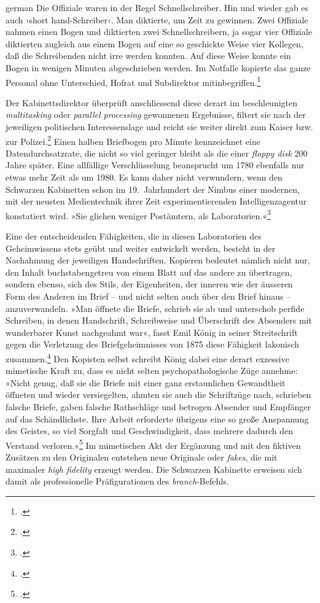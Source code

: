 \documentclass[a4paper,11pt]{article}
\newcommand{\anf}[1]{»#1«}
\newcommand{\inanf}[1]{›#1‹}
\newenvironment{zitat}{
\begin{foreigndisplayquote}{german}}%
{\end{foreigndisplayquote}}
\begin{document}
\begin{zitat}
Die Offiziale waren in der Regel Schnellschreiber. Hin und wieder gab es auch \inanf{short hand-Schreiber}. Man diktierte, um Zeit zu gewinnen. Zwei Offiziale nahmen einen Bogen und diktierten zwei Schnellschreibern, ja sogar vier Offiziale diktierten zugleich aus einem Bogen auf eine so geschickte Weise vier Kollegen, daß die Schreibenden nicht irre werden konnten. Auf diese Weise konnte ein Bogen in wenigen Minuten abgeschrieben werden. Im Notfalle kopierte das ganze Personal ohne Unterschied, Hofrat und Subdirektor mitinbegriffen.\footcite[139]{stix:1937}
\end{zitat}
Der Kabinettsdirektor überprüft anschliessend diese derart im beschleunigten \emph{multitasking} oder \emph{parallel processing} gewonnenen Ergebnisse, filtert sie nach der jeweiligen politischen Interessenslage und reicht sie weiter direkt zum Kaiser bzw. zur Polizei.\footcite[140]{stix:1937} Einen halben Briefbogen pro Minute kennzeichnet eine Datendurchsatzrate, die nicht so viel geringer bleibt als die einer \emph{floppy disk} 200 Jahre später. Eine allfällige Verschlüsselung beansprucht um 1780 ebenfalls nur etwas mehr Zeit als um 1980. Es kann daher nicht verwundern, wenn den Schwarzen Kabinetten schon im 19.~Jahrhundert der Nimbus einer modernen, mit der neusten Medientechnik ihrer Zeit experimentierenden Intelligenzagentur konstatiert wird. \anf{Sie glichen weniger Postämtern, als Laboratorien.}\footcite[40]{koenig:1875}

Eine der entscheidenden Fähigkeiten, die in diesen Laboratorien des Geheimwissens stets geübt und weiter entwickelt werden, besteht in der Nachahmung der jeweiligen Handschriften. Kopieren bedeutet nämlich nicht nur, den Inhalt buchstabengetreu von einem Blatt auf das andere zu übertragen, sondern ebenso, sich des Stils, der Eigenheiten, der inneren wie der äusseren Form des Anderen im Brief – und nicht selten auch über den Brief hinaus – anzuverwandeln. \anf{Man öffnete die Briefe, schrieb sie ab und unterschob perfide Schreiben, in denen Handschrift, Schreibweise und Überschrift des Absenders mit wunderbarer Kunst nachgeahmt war}, fasst Emil König in seiner Streitschrift gegen die Verletzung des Briefgeheimnisses von 1875 diese Fähigkeit lakonisch zusammen.\footcite[34]{koenig:1875} Den Kopisten selbst schreibt König dabei eine derart exzessive mimetische Kraft zu, dass es nicht selten psychopathologische Züge annehme: \anf{Nicht genug, daß sie die Briefe mit einer ganz erstaunlichen Gewandtheit öffneten und wieder versiegelten, ahmten sie auch die Schriftzüge nach, schrieben falsche Briefe, gaben falsche Rathschläge und betrogen Absender und Empfänger auf das Schändlichste. Ihre Arbeit erforderte übrigens eine so große Anspannung des Geistes, so viel Sorgfalt und Geschwindigkeit, dass mehrere dadurch den Verstand verloren.}\footcite[38]{koenig:1875} Im mimetischen Akt der Ergänzung und mit den fiktiven Zusätzen zu den Originalen entstehen neue Originale oder \emph{fakes}, die mit maximaler \emph{high fidelity} erzeugt werden. Die Schwarzen Kabinette erweisen sich damit als professionelle Präfigurationen des \emph{branch}-Befehls.
\end{document}
